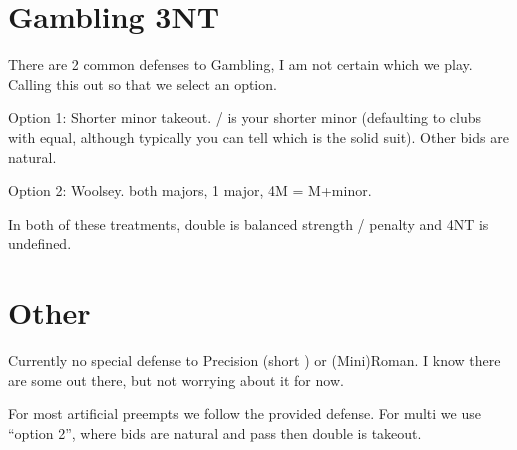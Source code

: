 \documentclass[tom-ari]{subfile}
\begin{document}
	\section{Gambling 3NT}
	
	There are 2 common defenses to Gambling, I am not certain which we play. Calling this out so that we select an option.
	
	Option 1:  Shorter minor takeout. / is your shorter minor (defaulting to clubs with equal, although typically you can tell which is the solid suit). Other bids are natural.
	
	Option 2:  Woolsey.  both majors,  1 major, 4M = M+minor.
	
	In both of these treatments, double is balanced strength / penalty and 4NT is undefined.
	
	\section{Other}
	
	Currently no special defense to  Precision (short \diamondsuit) or (Mini)Roman. I know there are some out there, but not worrying about it for now.
	
	For most artificial preempts we follow the provided defense. For multi we use ``option 2'', where bids are natural and pass then double is takeout.
	
\end{document}
